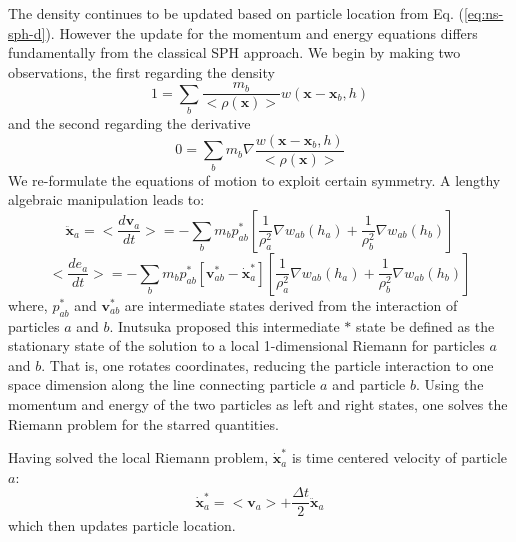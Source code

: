 \documentclass[review]{elsarticle}
\begin{document}
The density continues to be updated based on particle location from Eq. (\ref{eq:ns-sph-d}). However the update for the momentum and energy equations differs fundamentally from the classical SPH approach. We begin by making two observations, the first regarding the density
\begin{equation}
1=\sum_{b} \frac{m_{b}}{<\rho(\textbf{x})>}w(\textbf{x} - \textbf{x}_{b}, h)
\label{eq:GSPH-basic1}
\end{equation}
and the second regarding the derivative 
\begin{equation}
0=\sum_{b} m_{b} \nabla \frac{w(\textbf{x} - \textbf{x}_{b}, h)}{<\rho(\textbf{x})>}
\label{eq:GSPH-basic2}
\end{equation}
We re-formulate the equations of motion to exploit certain symmetry. A lengthy algebraic manipulation \citep{inutsuka2002reformulation,iwasaki2011smoothed} leads to:
\begin{equation}
\ddot{\textbf{x}}_{a} = <\dfrac{d \textbf{v}_{a}}{dt}>= -\sum_{b} m_{b} p_{a b}^{\ast} \left[\frac{1}{\rho_{a}^2} \nabla w_{a b}(h_{a}) + \frac{1}{\rho_{b}^2} \nabla w_{a b}(h_{b}) \right]
\label{eq:gov-gsph-v-simple-form}
\end{equation}
\begin{equation}
<\dfrac{d e_{a}}{dt}>= - \sum_{b} m_{b} p_{a b}^{\ast} [\textbf{v}_{a b}^{\ast} - \dot{\textbf{x}}_{a}^{\ast}] \left[\frac{1}{\rho_{a}^2} \nabla w_{a b}(h_{a}) + \frac{1}{\rho_{b}^2} \nabla w_{a b}(h_{b}) \right]
\label{eq:gov-gsph-e-simple-form}
\end{equation}
where, $p_{a b}^{\ast}$ and $\textbf{v}_{a b}^{\ast}$ are intermediate states derived from the interaction of particles $a$ and $b$. Inutsuka proposed this intermediate $\ast$ state be defined as the stationary state of the solution to a local 1-dimensional Riemann for particles $a$ and $b$.  That is, one rotates coordinates, reducing the particle interaction to one space dimension along the line connecting particle $a$ and particle $b$. Using the momentum and energy of the two particles as left and right states, one solves the Riemann problem for the starred quantities.

Having solved the local Riemann problem, 
$\dot{\textbf{x}}_{a}^{\ast}$ is time centered velocity of particle $a$:
\begin{equation}
\dot{\textbf{x}}_{a}^{\ast} = <\textbf{v}_{a}> + \frac{\Delta t}{2} \ddot{\textbf{x}}_{a}
\end{equation}
which then updates particle location.
\end{document}
